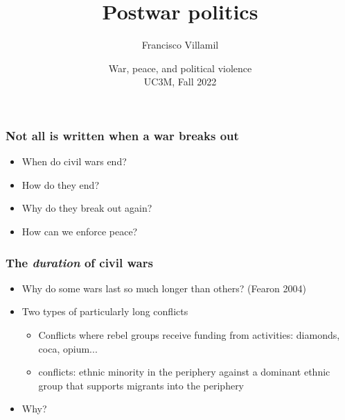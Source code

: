 \documentclass[aspectratio=43]{beamer}
\title{\huge Postwar politics}
\author{Francisco Villamil}
\date{War, peace, and political violence\\UC3M, Fall 2022}
\begin{document}
\begin{frame}
  \titlepage
\end{frame}

\begin{frame}
\frametitle{Not all is written when a war breaks out}
\centering

\begin{itemize}[<+->]
  \item When do civil wars end?
  \item How do they end?
  \item Why do they break out again?
  \item How can we enforce peace?
\end{itemize}

\end{frame}

\begin{frame}
\frametitle{The \textit{duration} of civil wars}
\centering

\begin{itemize}[<+->]
  \item Why do some wars last so much longer than others? {\scriptsize (Fearon 2004)}
  \item Two types of particularly long conflicts
  \begin{itemize}
    \item Conflicts where rebel groups receive funding from {\color{red}{contraband}} activities: diamonds, coca, opium...
    \item {\color{red}{`Sons-of-the-soil'}} conflicts: ethnic minority in the periphery against a dominant ethnic group that supports migrants into the periphery
  \end{itemize}
  \item Why?
\end{itemize}

\end{frame}
\end{document}
